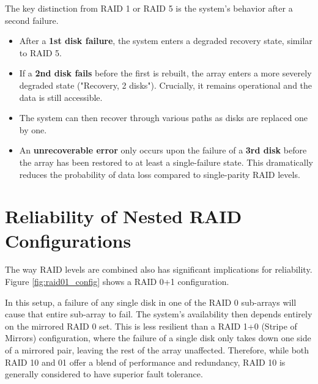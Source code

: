 
The key distinction from RAID 1 or RAID 5 is the system's behavior after a second failure.
\begin{itemize}
    \item After a \textbf{1st disk failure}, the system enters a degraded recovery state, similar to RAID 5.
    \item If a \textbf{2nd disk fails} before the first is rebuilt, the array enters a more severely degraded state ("Recovery, 2 disks"). Crucially, it remains operational and the data is still accessible.
    \item The system can then recover through various paths as disks are replaced one by one.
    \item An \textbf{unrecoverable error} only occurs upon the failure of a \textbf{3rd disk} before the array has been restored to at least a single-failure state. This dramatically reduces the probability of data loss compared to single-parity RAID levels.
\end{itemize}

\section{Reliability of Nested RAID Configurations}

The way RAID levels are combined also has significant implications for reliability. Figure \ref{fig:raid01_config} shows a RAID 0+1 configuration.


In this setup, a failure of any single disk in one of the RAID 0 sub-arrays will cause that entire sub-array to fail. The system's availability then depends entirely on the mirrored RAID 0 set. This is less resilient than a RAID 1+0 (Stripe of Mirrors) configuration, where the failure of a single disk only takes down one side of a mirrored pair, leaving the rest of the array unaffected. Therefore, while both RAID 10 and 01 offer a blend of performance and redundancy, RAID 10 is generally considered to have superior fault tolerance.